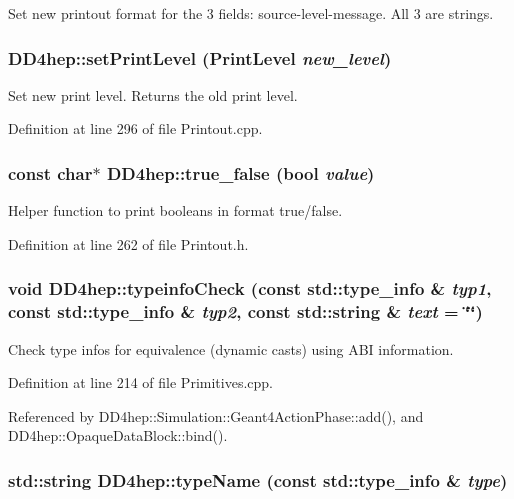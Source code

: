 Set new printout format for the 3 fields: source-\/level-\/message. All 3 are strings. \hypertarget{namespace_d_d4hep_a01aab75bd90e7887aaec1fbf3b4eb03d}{
\subsubsection[{setPrintLevel}]{ DD4hep::setPrintLevel (PrintLevel {\em new\_\-level})}}
\label{namespace_d_d4hep_a01aab75bd90e7887aaec1fbf3b4eb03d}


Set new print level. Returns the old print level. 

Definition at line 296 of file Printout.cpp.\hypertarget{namespace_d_d4hep_a32a48a8889b636138d95a06c5818a858}{
\subsubsection[{true\_\-false}]{\setlength{\rightskip}{0pt plus 5cm}const char$\ast$ DD4hep::true\_\-false (bool {\em value})}}
\label{namespace_d_d4hep_a32a48a8889b636138d95a06c5818a858}


Helper function to print booleans in format true/false. 

Definition at line 262 of file Printout.h.\hypertarget{namespace_d_d4hep_ad28e7066d6a18fdd0422755c43425883}{
\subsubsection[{typeinfoCheck}]{\setlength{\rightskip}{0pt plus 5cm}void DD4hep::typeinfoCheck (const std::type\_\-info \& {\em typ1}, \/  const std::type\_\-info \& {\em typ2}, \/  const std::string \& {\em text} = {\ttfamily \char`\"{}\char`\"{}})}}
\label{namespace_d_d4hep_ad28e7066d6a18fdd0422755c43425883}


Check type infos for equivalence (dynamic casts) using ABI information. 

Definition at line 214 of file Primitives.cpp.

Referenced by DD4hep::Simulation::Geant4ActionPhase::add(), and DD4hep::OpaqueDataBlock::bind().\hypertarget{namespace_d_d4hep_aac3aec612736d0521670ca2e7b1305bd}{
\subsubsection[{typeName}]{\setlength{\rightskip}{0pt plus 5cm}std::string DD4hep::typeName (const std::type\_\-info \& {\em type})}}
\label{namespace_d_d4hep_aac3aec612736d0521670ca2e7b1305bd}


